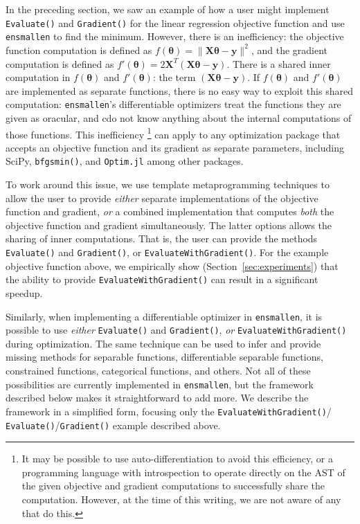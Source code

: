 In the preceding section, we saw an example of how a user might implement {\tt
Evaluate()} and {\tt Gradient()} for the linear regression objective function
and use {\tt ensmallen} to find the minimum.
However, there is an inefficiency:
the objective function computation is defined as $f(\bm \theta) = \| \bm X \bm \theta - \bm y \|^2$,
and the gradient computation is defined as $f'(\bm \theta) = 2 \bm X^T (\bm X \bm \theta - \bm y)$.
There is a shared inner computation in $f(\bm \theta)$ and $f'(\bm \theta)$: the
term $(\bm X \bm \theta - \bm y)$.
If $f(\bm \theta)$ and $f'(\bm \theta)$ are implemented as separate functions,
there is no easy way to exploit this shared computation:
{\tt ensmallen}'s differentiable optimizers treat the functions they are given as oracular,
and cdo not know anything about the internal computations of those functions.
This inefficiency%
\footnote
  {It may be possible to use auto-differentiation to avoid this efficiency,
  or a programming language with introspection to operate directly on the AST of the
  given objective and gradient computations to successfully share the computation.
  However, at the time of this writing, we are not aware of any that do this.
  }
can apply to any optimization package that accepts an objective
function and its gradient as separate parameters, including SciPy, {\tt bfgsmin()},
and {\tt Optim.jl} among other packages.

To work around this issue, we use template metaprogramming techniques to allow
the user to provide {\it either} separate implementations of the objective
function and gradient, {\it or} a combined implementation that computes {\it
both} the objective function and gradient simultaneously.
The latter options allows the sharing of inner computations.
That is, the user can provide the methods {\tt Evaluate()} and {\tt Gradient()},
or {\tt EvaluateWithGradient()}.
For the example objective function above,
we empirically show (Section~\ref{sec:experiments}) that the ability to provide
{\tt EvaluateWithGradient()} can result in a significant speedup.

Similarly, when implementing a differentiable optimizer in {\tt ensmallen},
it is possible to use {\it either} {\tt Evaluate()} and {\tt Gradient()},
{\it or} {\tt EvaluateWithGradient()} during optimization.
The same technique can be used to infer and provide missing methods
for separable functions, differentiable separable functions, constrained
functions, categorical functions, and others.  Not all of these possibilities
are currently implemented in {\tt ensmallen}, but the framework described below
makes it straightforward to add more.  We describe the framework in a
simplified form, focusing only the {\tt EvaluateWithGradient()}/{\tt
Evaluate()}/{\tt Gradient()} example described above.

